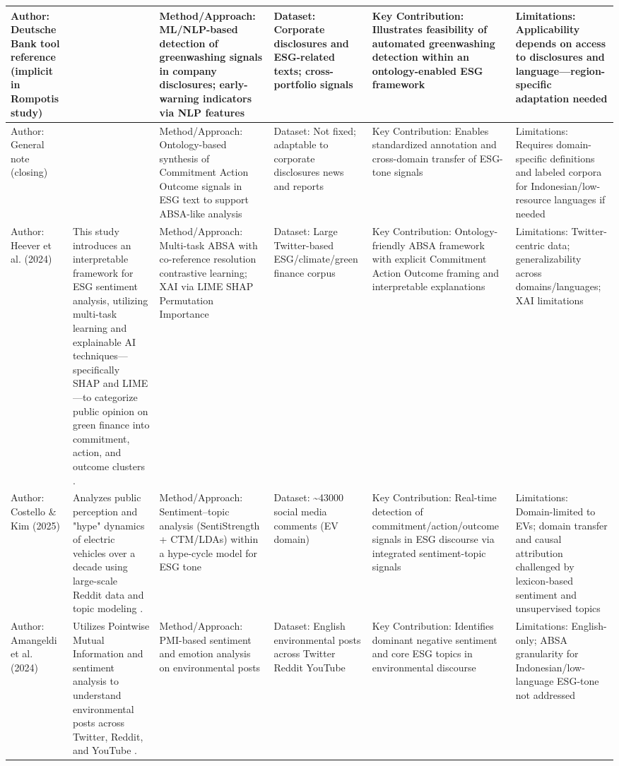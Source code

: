 \documentclass{article}
\begin{document}
\begin{landscape}
\begin{longtable}{p{1.8cm}
p{2.6cm}
p{3.4cm}
p{2.6cm}
p{3.5cm}
p{3.5cm}}
Author: Deutsche Bank tool reference (implicit in Rompotis study) & ~ & Method/Approach: ML/NLP-based detection of greenwashing signals in company disclosures; early-warning indicators via NLP features & Dataset: Corporate disclosures and ESG-related texts; cross-portfolio signals & Key Contribution: Illustrates feasibility of automated greenwashing detection within an ontology-enabled ESG framework & Limitations: Applicability depends on access to disclosures and language—region-specific adaptation needed \\ \hline
Author: General note (closing) & ~ & Method/Approach: Ontology-based synthesis of Commitment Action Outcome signals in ESG text to support ABSA-like analysis & Dataset: Not fixed; adaptable to corporate disclosures news and reports & Key Contribution: Enables standardized annotation and cross-domain transfer of ESG-tone signals & Limitations: Requires domain-specific definitions and labeled corpora for Indonesian/low-resource languages if needed \\ \hline
Author: Heever et al. (2024) & This study introduces an interpretable framework for ESG sentiment analysis, utilizing multi-task learning and explainable AI techniques—specifically SHAP and LIME—to categorize public opinion on green finance into commitment, action, and outcome clusters  \parencite{wihan_van_der_heever_44c76c99}. & Method/Approach: Multi-task ABSA with co-reference resolution contrastive learning; XAI via LIME SHAP Permutation Importance & Dataset: Large Twitter-based ESG/climate/green finance corpus & Key Contribution: Ontology-friendly ABSA framework with explicit Commitment Action Outcome framing and interpretable explanations & Limitations: Twitter-centric data; generalizability across domains/languages; XAI limitations \\ \hline
Author: Costello \& Kim (2025) & Analyzes public perception and "hype" dynamics of electric vehicles over a decade using large-scale Reddit data and topic modeling  \parencite{tao_ruan_824a9480}. & Method/Approach: Sentiment–topic analysis (SentiStrength + CTM/LDAs) within a hype-cycle model for ESG tone & Dataset: \textasciitilde{}43000 social media comments (EV domain) & Key Contribution: Real-time detection of commitment/action/outcome signals in ESG discourse via integrated sentiment-topic signals & Limitations: Domain-limited to EVs; domain transfer and causal attribution challenged by lexicon-based sentiment and unsupervised topics \\ \hline
Author: Amangeldi et al. (2024) & Utilizes Pointwise Mutual Information and sentiment analysis to understand environmental posts across Twitter, Reddit, and YouTube  \parencite{daniyar_amangeldi_dfc2f315}. & Method/Approach: PMI-based sentiment and emotion analysis on environmental posts & Dataset: English environmental posts across Twitter Reddit YouTube & Key Contribution: Identifies dominant negative sentiment and core ESG topics in environmental discourse & Limitations: English-only; ABSA granularity for Indonesian/low-language ESG-tone not addressed \\ \hline

\end{longtable}
\end{landscape}
\end{document}
